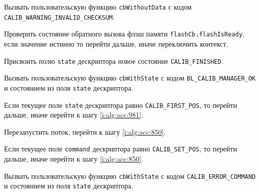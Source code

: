 \begin{enumerate_step}
    \item Вызвать пользовательскую функцию \lstinline|cbWithoutData| с кодом \lstinline|CALIB_WARNING_INVALID_CHECKSUM|.
    \item \label{i:alg:acc:953} Проверить состояние обратного вызова флэш памяти \lstinline|flashCb.flashIsReady|, если значение истинно то перейти дальше, иначе переключить контекст.
    \item Присвоить полю \lstinline|state| дескриптора новое состояние \lstinline|CALIB_FINISHED|.
    \item Вызвать пользовательскую функцию \lstinline|cbWithState| с кодом \lstinline|BL_CALIB_MANAGER_OK| и состоянием из поля \lstinline|state| дескриптора.

    \item \label{i:alg:acc:973} Если текущее поле \lstinline|state| дескриптора равно \lstinline|CALIB_FIRST_POS|, то перейти дальше, иначе перейти к шагу
    \ref{i:alg:acc:981}.
    \item Перезапустить поток, перейти к шагу \ref{i:alg:acc:850}.
    \item \label{i:alg:acc:981} Если текущее поле \lstinline|command| дескриптора равно \lstinline|CALIB_SET_POS|, то перейти дальше, иначе перейти к шагу
    \ref{i:alg:acc:850}.
    \item Вызвать пользовательскую функцию \lstinline|cbWithState| с кодом \lstinline|CALIB_ERROR_COMMAND| и состоянием из поля \lstinline|state| дескриптора.


\end{enumerate_step}
